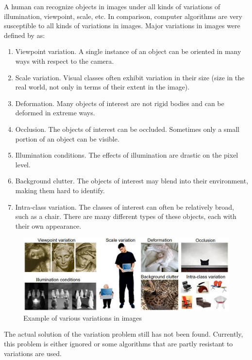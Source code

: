 A human can recognize objects in images under all kinds of variations of illumination, viewpoint, scale, etc. In comparison, computer algorithms are very susceptible to all kinds of variations in images. Major variations in images were defined by \cite{231n} as:

\begin{enumerate}
\item Viewpoint variation. A single instance of an object can be oriented in many ways with respect to the camera.
\item Scale variation. Visual classes often exhibit variation in their size (size in the real world, not only in terms of their extent in the image).
\item Deformation. Many objects of interest are not rigid bodies and can be deformed in extreme ways.
\item Occlusion. The objects of interest can be occluded. Sometimes only a small portion of an object can be visible.
\item Illumination conditions. The effects of illumination are drastic on the pixel level.
\item Background clutter. The objects of interest may blend into their environment, making them hard to identify.
\item Intra-class variation. The classes of interest can often be relatively broad, such as a chair. There are many different types of these objects, each with their own appearance.
\end{enumerate}


 \begin{figure}[h]
\centering
\includegraphics[width=14cm]{Figures/2/challenges.jpeg}
\caption{Example of various variations in images \citep{231n}}
\label{fig:imgnet}
\end{figure}

The actual solution of the variation problem still has not been found. Currently, this problem is either ignored or some algorithms that are partly resistant to variations are used.

